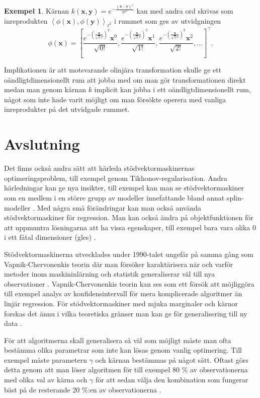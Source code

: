 \documentclass[a4paper, 12pt]{report}
\theoremstyle{definition}
\newtheorem{ex}{Exempel}[section]
\theoremstyle{remark}
\newcommand{\bfx}{\mathbf{x}}
\newcommand{\bfy}{\mathbf{y}}
\newcommand{\llangle}{\left\langle}
\newcommand{\rrangle}{\right\rangle}
\newcommand{\inner}[2]{\llangle #1, #2 \rrangle}
\begin{document}
\begin{ex}
	Kärnan $k\left(\bfx, \bfy\right)=e^{-\frac{\left\| \bfx-\bfy\right\|^2}{2\sigma^2}}$ kan med andra ord skrivas som inreprodukten $\inner{\phi\left(\bfx\right)}{\phi\left(\bfy\right)}_{\ell^2}$ i rummet som ges av utvidgningen
	\begin{equation*}
	\phi\left(\bfx\right)=\left[\frac{e^{-\left(\frac{\bfx}{\sqrt{2}\sigma}\right)^2} \bfx^0}{\sqrt{0!}}, \frac{e^{-\left(\frac{\bfx}{\sqrt{2}\sigma}\right)^2} \bfx^1}{\sqrt{1!}}, \frac{e^{-\left(\frac{\bfx}{\sqrt{2}\sigma}\right)^2} \bfx^2}{\sqrt{2!}}, \dots\right]^\intercal.
	\end{equation*}
	
	Implikationen är att motsvarande olinjära transformation skulle ge ett oändligtdimensionellt rum att jobba med om man gör transformationen direkt medan man genom kärnan $k$ implicit kan jobba i ett oändligtdimensionellt rum, något som inte hade varit möjligt om man försökte operera med vanliga inreprodukter på det utvidgade rummet.
\end{ex}



\chapter{Avslutning}
Det finns också andra sätt att härleda stödvektormaskinernas optimeringsproblem, till exempel genom Tikhonov-regularisation. Andra härledningar kan ge nya insikter, till exempel kan man se stödvektormaskiner som en medlem i en större grupp av modeller innefattande bland annat splin-modeller \cite{ESL}. Med några små förändringar kan man också använda stödvektormaskiner för regression. Man kan också ändra på objektfunktionen för att uppmuntra lösningarna att ha vissa egenskaper, till exempel bara vara olika 0 i ett fåtal dimensioner (gles) \cite{LearningKernels}.

Stödvektormaskinerna utvecklades under 1990-talet ungefär på samma gång som Vapnik-Chervonenkis teorin där man försöker karaktärisera när och varför metoder inom maskininlärning och statistik generaliserar väl till nya observationer \cite{VC}. Vapnik-Chervonenkis teorin kan ses som ett försök att möjliggöra till exempel analys av konfidensintervall för mera komplicerade algoritmer än linjär regression. För stödvektormaskiner med mjuka marginaler och kärnor forskas det ännu i vilka teoretiska gränser man kan ge för generalisering till ny data \cite{theoretical}.

För att algoritmerna skall generalisera så väl som möjligt måste man ofta bestämma olika parametrar som inte kan lösas genom vanlig optimering. Till exempel måste parametern $\gamma$ och kärnan bestämmas på något sätt. Oftast görs detta genom att man löser algoritmen för till exempel 80 \% av observationerna med olika val av kärna och $\gamma$ för att sedan välja den kombination som fungerar bäst på de resterande 20 \%:en av observationerna \cite{ESL}.
\end{document}
